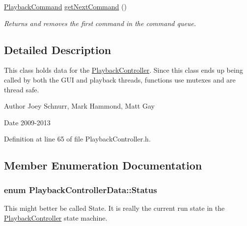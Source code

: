 \begin{DoxyCompactItemize}
\hypertarget{class_playback_controller_data_a29956a96a606909177487993b8d03b86}{\hyperlink{struct_playback_command}{Playback\-Command} \hyperlink{class_playback_controller_data_a29956a96a606909177487993b8d03b86}{get\-Next\-Command} ()}\label{class_playback_controller_data_a29956a96a606909177487993b8d03b86}

\begin{DoxyCompactList}\small\item\em Returns and removes the first command in the command queue. \end{DoxyCompactList}\end{DoxyCompactItemize}


\subsection{Detailed Description}
This class holds data for the \hyperlink{class_playback_controller}{Playback\-Controller}. Since this class ends up being called by both the G\-U\-I and playback threads, functions use mutexes and are thread safe. 

\begin{DoxyAuthor}{Author}
Joey Schnurr, Mark Hammond, Matt Gay 
\end{DoxyAuthor}
\begin{DoxyDate}{Date}
2009-\/2013 
\end{DoxyDate}


Definition at line 65 of file Playback\-Controller.\-h.



\subsection{Member Enumeration Documentation}
\hypertarget{class_playback_controller_data_a64757fd28c6f9ab34d438f6c778eaf90}{
\subsubsection[{Status}]{\setlength{\rightskip}{0pt plus 5cm}enum {\bf Playback\-Controller\-Data\-::\-Status}}}\label{class_playback_controller_data_a64757fd28c6f9ab34d438f6c778eaf90}


This might better be called State. It is really the current run state in the \hyperlink{class_playback_controller}{Playback\-Controller} state machine. 


